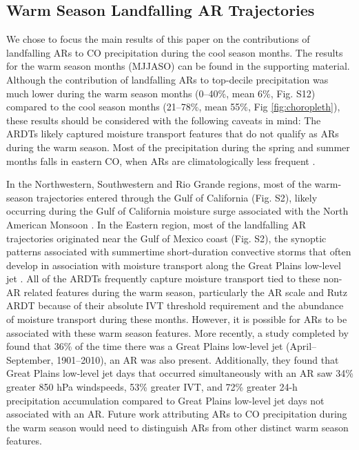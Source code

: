 \documentclass[draft]{agujournal2019}
\begin{document}
\subsection{Warm Season Landfalling AR Trajectories}
\label{sec:results:warm-season}

We chose to focus the main results of this paper on the contributions of landfalling ARs to CO precipitation during the cool season months. The results for the warm season months (MJJASO) can be found in the supporting material. Although the contribution of landfalling ARs to top-decile precipitation was much lower during the warm season months (0--40\%, mean 6\%, Fig. S12) compared to the cool season months (21--78\%, mean 55\%, Fig \ref{fig:choropleth}), these results should be considered with the following caveats in mind: The ARDTs likely captured moisture transport features that do not qualify as ARs during the warm season. Most of the precipitation during the spring and summer months falls in eastern CO, when ARs are climatologically less frequent \cite{Doesken1984Period., Guan2015, Harvey2019CitizensFrom}.

In the Northwestern, Southwestern and Rio Grande regions, most of the warm-season trajectories entered through the Gulf of California (Fig. S2), likely occurring during the Gulf of California moisture surge associated with the North American Monsoon \cite{Higgins2004RelationshipsStates, https://doi.org/10.1029/2017JD027652}. In the Eastern region, most of the landfalling AR trajectories originated near the Gulf of Mexico coast (Fig. S2), the synoptic patterns associated with summertime short-duration convective storms that often develop in association with moisture transport along the Great Plains low-level jet \cite{Helfand1995ClimatologyStates, Pu2016DynamicalPrecipitation,  Schubert1998SubseasonalStates, Weaver2008VariabilityImpacts}. All of the ARDTs frequently capture moisture transport tied to these non-AR related features during the warm season, particularly the AR scale and Rutz ARDT because of their absolute IVT threshold requirement and the abundance of moisture transport during these months. However, it is possible for ARs to be associated with these warm season features. More recently, a study completed by  found that 36\% of the time there was a Great Plains low-level jet (April--September, 1901--2010), an AR was also present. Additionally, they found that Great Plains low-level jet days that occurred simultaneously with an AR saw 34\% greater 850 hPa windspeeds, 53\% greater IVT, and 72\% greater 24-h precipitation accumulation compared to Great Plains low-level jet days not associated with an AR. Future work attributing ARs to CO precipitation during the warm season would need to distinguish ARs from other distinct warm season features.
\end{document}
